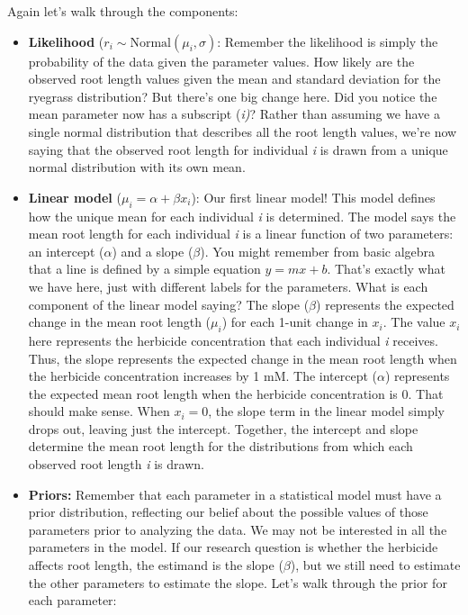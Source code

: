 \documentclass[
]{book}
\begin{document}
Again let's walk through the components:

\begin{itemize}
\item
  \textbf{Likelihood} (\(r_i \sim \mathrm{Normal}(\mu_i, \sigma)\): Remember the likelihood is simply the probability of the data given the parameter values. How likely are the observed root length values given the mean and standard deviation for the ryegrass distribution? But there's one big change here. Did you notice the mean parameter now has a subscript (\emph{i)}? Rather than assuming we have a single normal distribution that describes all the root length values, we're now saying that the observed root length for individual \emph{i} is drawn from a unique normal distribution with its own mean.
\item
  \textbf{Linear model} (\(\mu_i = \alpha + \beta x_i\)): Our first linear model! This model defines how the unique mean for each individual \emph{i} is determined. The model says the mean root length for each individual \emph{i} is a linear function of two parameters: an intercept (\(\alpha\)) and a slope (\(\beta\)). You might remember from basic algebra that a line is defined by a simple equation \(y = mx + b\). That's exactly what we have here, just with different labels for the parameters. What is each component of the linear model saying? The slope (\(\beta\)) represents the expected change in the mean root length (\(\mu_i\)) for each 1-unit change in \(x_i\). The value \(x_i\) here represents the herbicide concentration that each individual \emph{i} receives. Thus, the slope represents the expected change in the mean root length when the herbicide concentration increases by 1 mM. The intercept (\(\alpha\)) represents the expected mean root length when the herbicide concentration is 0. That should make sense. When \(x_i=0\), the slope term in the linear model simply drops out, leaving just the intercept. Together, the intercept and slope determine the mean root length for the distributions from which each observed root length \emph{i} is drawn.
\item
  \textbf{Priors:} Remember that each parameter in a statistical model must have a prior distribution, reflecting our belief about the possible values of those parameters prior to analyzing the data. We may not be interested in all the parameters in the model. If our research question is whether the herbicide affects root length, the estimand is the slope (\(\beta\)), but we still need to estimate the other parameters to estimate the slope. Let's walk through the prior for each parameter:


\end{itemize}
\end{document}
